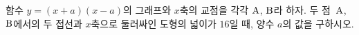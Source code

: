 함수 $y=(x+a)(x-a)$의 그래프와 $x$축의 교점을 각각 $\mathrm{A}$, $\mathrm{B}$라 하자. 두 점~$\mathrm{A}$, $\mathrm{B}$에서의 두 접선과 $x$축으로 둘러싸인 도형의 넓이가 $16$일 때, 양수 $a$의 값을 구하시오.
